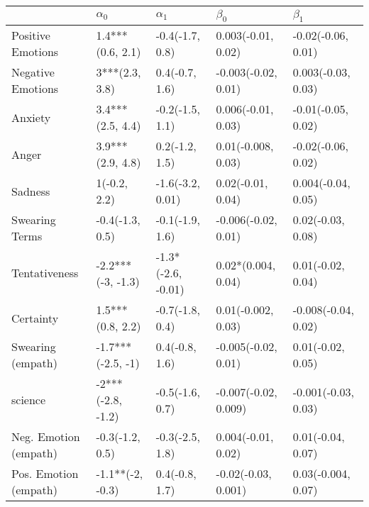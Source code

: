 \begin{tabular}{lllll}
\toprule
{} &         $\alpha_0$ &          $\alpha_1$ &             $\beta_0$ &            $\beta_1$ \\
\midrule
Positive Emotions     &   1.4***(0.6, 2.1) &     -0.4(-1.7, 0.8) &    0.003(-0.01, 0.02) &   -0.02(-0.06, 0.01) \\
Negative Emotions     &     3***(2.3, 3.8) &      0.4(-0.7, 1.6) &   -0.003(-0.02, 0.01) &   0.003(-0.03, 0.03) \\
Anxiety               &   3.4***(2.5, 4.4) &     -0.2(-1.5, 1.1) &    0.006(-0.01, 0.03) &   -0.01(-0.05, 0.02) \\
Anger                 &   3.9***(2.9, 4.8) &      0.2(-1.2, 1.5) &    0.01(-0.008, 0.03) &   -0.02(-0.06, 0.02) \\
Sadness               &       1(-0.2, 2.2) &    -1.6(-3.2, 0.01) &     0.02(-0.01, 0.04) &   0.004(-0.04, 0.05) \\
Swearing Terms        &    -0.4(-1.3, 0.5) &     -0.1(-1.9, 1.6) &   -0.006(-0.02, 0.01) &    0.02(-0.03, 0.08) \\
Tentativeness         &  -2.2***(-3, -1.3) &  -1.3*(-2.6, -0.01) &    0.02*(0.004, 0.04) &    0.01(-0.02, 0.04) \\
Certainty             &   1.5***(0.8, 2.2) &     -0.7(-1.8, 0.4) &    0.01(-0.002, 0.03) &  -0.008(-0.04, 0.02) \\
Swearing (empath)     &  -1.7***(-2.5, -1) &      0.4(-0.8, 1.6) &   -0.005(-0.02, 0.01) &    0.01(-0.02, 0.05) \\
science               &  -2***(-2.8, -1.2) &     -0.5(-1.6, 0.7) &  -0.007(-0.02, 0.009) &  -0.001(-0.03, 0.03) \\
Neg. Emotion (empath) &    -0.3(-1.2, 0.5) &     -0.3(-2.5, 1.8) &    0.004(-0.01, 0.02) &    0.01(-0.04, 0.07) \\
Pos. Emotion (empath) &   -1.1**(-2, -0.3) &      0.4(-0.8, 1.7) &   -0.02(-0.03, 0.001) &   0.03(-0.004, 0.07) \\
\bottomrule
\end{tabular}
